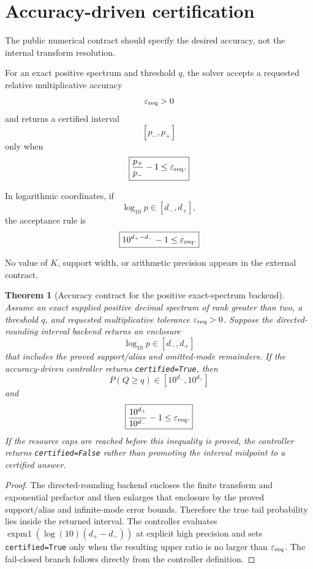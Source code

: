 \documentclass[11pt]{article}
\newtheorem{theorem}{Theorem}[section]
\theoremstyle{definition}
\theoremstyle{remark}
\begin{document}
\section{Accuracy-driven certification}

The public numerical contract should specify the desired accuracy, not the
internal transform resolution.

For an exact positive spectrum and threshold \(q\), the solver accepts a
requested relative multiplicative accuracy
\[
\varepsilon_{\rm req}>0
\]
and returns a certified interval
\[
[p_-,p_+]
\]
only when
\[
\boxed{
\frac{p_+}{p_-}-1
\le
\varepsilon_{\rm req}.
}
\]

In logarithmic coordinates, if
\[
\log_{10}p\in[d_-,d_+],
\]
the acceptance rule is
\[
\boxed{
10^{d_+-d_-}-1
\le
\varepsilon_{\rm req}.
}
\]

No value of \(K\), support width, or arithmetic precision appears in the
external contract.

\begin{theorem}[Accuracy contract for the positive exact-spectrum backend]
Assume an exact supplied positive decimal spectrum of rank greater than two,
a threshold \(q\), and requested multiplicative tolerance
\(\varepsilon_{\rm req}>0\).  Suppose the directed-rounding interval backend
returns an enclosure
\[
\log_{10}p\in[d_-,d_+]
\]
that includes the proved support/alias and omitted-mode remainders.  If the
accuracy-driven controller returns \texttt{certified=True}, then
\[
\boxed{
P(Q\ge q)\in[10^{d_-},10^{d_+}]
}
\]
and
\[
\boxed{
\frac{10^{d_+}}{10^{d_-}}-1
\le
\varepsilon_{\rm req}.
}
\]
If the resource caps are reached before this inequality is proved, the
controller returns \texttt{certified=False} rather than promoting the interval
midpoint to a certified answer.
\end{theorem}

\begin{proof}
The directed-rounding backend encloses the finite transform and exponential
prefactor and then enlarges that enclosure by the proved support/alias and
infinite-mode error bounds.  Therefore the true tail probability lies inside
the returned interval.  The controller evaluates
\(\operatorname{expm1}(\log(10)(d_+-d_-))\) at explicit high precision and
sets \texttt{certified=True} only when the resulting upper ratio is no larger
than \(\varepsilon_{\rm req}\).  The fail-closed branch follows directly from
the controller definition.
\end{proof}
\end{document}
